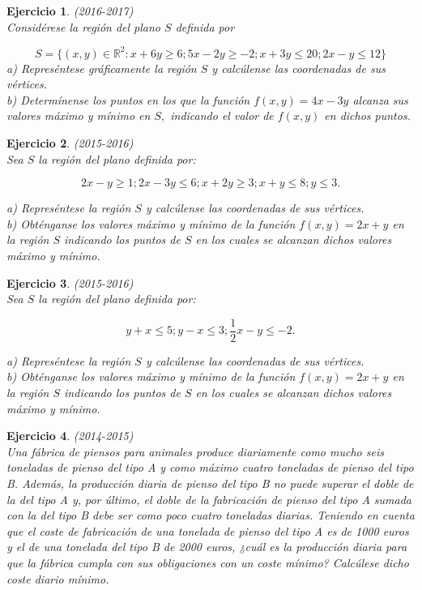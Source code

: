 \documentclass[12pt, a4paper]{amsart}
\newtheorem{ejer}{Ejercicio}
\begin{document}
\begin{ejer}\em (2016-2017)\\
Considérese la región del plano $S$ definida por

\[
S=\{(x,y)\in \mathbb{R}^2: x+6y\geq 6; 5x-2y\geq -2; x+3y\leq 20; 2x-y\leq 12\}
\]
a) Represéntese gráficamente la región $S$ y calcúlense las coordenadas de sus vértices.\\
b) Determínense los puntos en los que la función $f (x, y) = 4x - 3y$ alcanza sus valores máximo y mínimo en $S,$ indicando el valor de $f (x, y)$ en dichos puntos.
\end{ejer}


\begin{ejer}\em (2015-2016)\\
Sea $S$ la región del plano definida por:

\[2x-y\geq 1; 2x-3y\leq 6; x+2y \geq 3; x+y\leq 8; y\leq 3.\]
\vspace*{5mm}

a) Represéntese la región $S$ y calcúlense las coordenadas de sus vértices.\\
b) Obténganse los valores máximo y mínimo de la función $f (x, y ) = 2x + y$ en la región $S$ indicando los puntos de $S$ en los cuales se alcanzan dichos valores máximo y mínimo.
\end{ejer}

\begin{ejer}\em (2015-2016)\\
Sea $S$ la región del plano definida por:

\[y+x\leq 5; y-x\leq 3; \frac{1}{2}x-y\leq -2.\]
\vspace*{5mm}

a) Represéntese la región $S$ y calcúlense las coordenadas de sus vértices.\\
b) Obténganse los valores máximo y mínimo de la función $f (x, y ) = 2x + y$ en la región $S$ indicando los puntos de $S$ en los cuales se alcanzan dichos valores máximo y mínimo.
\end{ejer}

\newpage

\begin{ejer}\em (2014-2015)\\
Una fábrica de piensos para animales produce diariamente como mucho seis toneladas de pienso del tipo A y como máximo cuatro toneladas de pienso del tipo B. Además, la producción diaria de pienso del tipo B no puede superar el doble de la del tipo A y, por último, el doble de la fabricación de pienso del tipo A sumada con la del tipo B debe ser como poco cuatro toneladas diarias. Teniendo en cuenta que el coste de fabricación de una tonelada de pienso del tipo A es de 1000 euros y el de una tonelada del tipo B de 2000 euros, ¿cuál es la producción diaria para que la fábrica cumpla con sus obligaciones con un coste mínimo? Calcúlese dicho coste diario mínimo.
\end{ejer}
\end{document}
